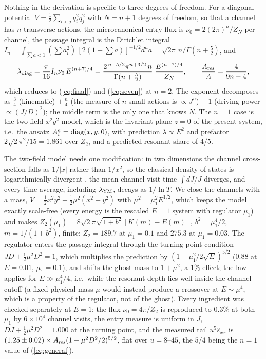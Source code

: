 \documentclass[11pt,a4paper]{article}
\newcommand{\YM}{{\rm YM}}
\begin{document}
Nothing in the derivation is specific to three degrees of freedom. For a diagonal potential
$V=\tfrac12\sum_{i<j}q_i^2q_j^2$ with $N=n+1$ degrees of freedom, so that a channel has $n$
transverse actions, the microcanonical entry flux is $\nu_0=2(2\pi)^n/Z_N$ per channel, the
passage integral is the Dirichlet integral
$I_n=\int_{\sum a<1}(\sum a_i^2)\,[2(1-\sum a)]^{-1/2}d^na=\sqrt{2\pi}\,n/\Gamma(n+\tfrac52)$,
and
\begin{equation}
\lambda_{\rm diag}=\frac{\pi}{16}I_n\nu_0\,E^{(n+7)/4}
=\frac{2^{\,n-5/2}\pi^{n+3/2}\,n}{\Gamma(n+\frac52)}\;\frac{E^{(n+7)/4}}{Z_N},
\qquad \frac{A_{\rm res}}{A}=\frac{4}{9n-4},
\label{eq:general}
\end{equation}
which reduces to (\ref{eq:final}) and (\ref{eq:seven}) at $n=2$. The exponent decomposes as
$\tfrac34$ (kinematic) $+\,\tfrac n4$ (the measure of $n$ small actions is $\propto J^n$)
$+\,1$ (driving power $\propto(J/D)^2$); the middle term is the only one that knows $N$. The
$n=1$ case is the two-field $x^2y^2$ model, which is the invariant plane $z=0$ of the present
system, i.e.\ the ansatz $A^a_i={\rm diag}(x,y,0)$, with prediction $\lambda\propto E^2$ and
prefactor $2\sqrt2\pi^2/15=1.861$ over $Z_2$, and a predicted resonant share of $4/5$.

The two-field model needs one modification: in two dimensions the channel cross-section falls as
$1/|x|$ rather than $1/x^2$, so the classical density of states is logarithmically divergent
\cite{Simon83}, the mean channel-visit time $\int dJ/J$ diverges, and every time average,
including $\lambda_\YM$, decays as $1/\ln T$. We close the channels with a mass,
$V=\tfrac12x^2y^2+\tfrac12\mu^2(x^2+y^2)$ with $\mu^2=\mu_1^2E^{1/2}$, which keeps the model
exactly scale-free (every energy is the rescaled $E=1$ system with regulator $\mu_1$) and makes
$Z_2(\mu_1)=8\sqrt2\pi\sqrt{1+b^2}\,[K(m)-E(m)]$, $b^2=\mu_1^4/2$, $m=1/(1+b^2)$, finite:
$Z_2=189.7$ at $\mu_1=0.1$ and $275.3$ at $\mu_1=0.03$. The regulator enters the passage
integral through the turning-point condition $JD+\tfrac12\mu^2D^2=1$, which multiplies the
prediction by $(1-\mu_1^2/2\sqrt E)^{5/2}$ ($0.88$ at $E=0.01$, $\mu_1=0.1$), and shifts the
ghost mass to $1+\mu^2$, a $1\%$ effect; the law applies for $E\gg\mu_1^4/4$, i.e.\ while the
resonant depth lies well inside the channel cutoff (a fixed physical mass $\mu$ would instead
produce a crossover at $E\sim\mu^4$, which is a property of the regulator, not of the ghost). Every ingredient was checked separately at $E=1$: the
flux $\nu_0=4\pi/Z_2$ is reproduced to $0.3\%$ at both $\mu_1$ by $6\times10^4$ channel visits,
the entry measure is uniform in $J$, $DJ+\tfrac12\mu^2D^2=1.000$ at the turning point, and the
measured tail $u^5\hat s_{xx}$ is $(1.25\pm0.02)\times A_{\rm res}(1-\mu^2D^2/2)^{5/2}$, flat
over $u=8$--$45$, the $5/4$ being the $n=1$ value of (\ref{eq:general}).
\end{document}
